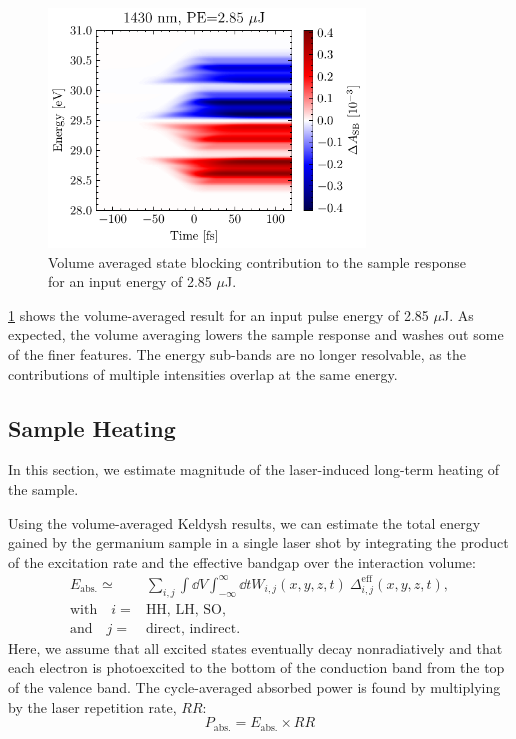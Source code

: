 \begin{figure}
	\centering
	\includegraphics[width=0.75\textwidth]{figures/chap4/dA_SB_calc_1430nm_2.85uJ.pdf}
	\caption{Volume averaged state blocking contribution to the sample response for an input energy of 2.85 $\mu$J.}
	\label{fig:dA_SB_calc_1430nm_2.85uJ}
\end{figure}

\cref{fig:dA_SB_calc_1430nm_2.85uJ} shows the volume-averaged result for an input pulse energy of 2.85 $\mu$J. As expected, the volume averaging lowers the sample response and washes out some of the finer features. The energy sub-bands are no longer resolvable, as the contributions of multiple intensities overlap at the same energy.



\subsection{Sample Heating}

In this section, we estimate magnitude of the laser-induced long-term heating of the sample. 

Using the volume-averaged Keldysh results, we can estimate the total energy gained by the germanium sample in a single laser shot by integrating the product of the excitation rate and the effective bandgap over the interaction volume:
\begin{equation}
\begin{split}
E_{\textrm{abs.}} \simeq {}& \sum_{i,j} \int \dd{V} \int_{-\infty}^{\infty} \dd{t} W_{i,j} (x, y, z, t) \ \Delta_{i,j}^{\textrm{eff}}(x,y,z,t), \\
\textrm{with} \quad i={}&\textrm{HH, LH, SO}, \\
\textrm{and} \quad j={}&\textrm{direct, indirect.}
\end{split}
\label{eqn:absorbed_energy}
\end{equation}
Here, we assume that all excited states eventually decay nonradiatively and that each electron is photoexcited to the bottom of the conduction band from the top of the valence band. The cycle-averaged absorbed power is found by multiplying by the laser repetition rate, $RR$:
\begin{equation}
P_{\textrm{abs.}} = E_{\textrm{abs.}} \times RR
\label{eqn:absorbed_power}
\end{equation}

